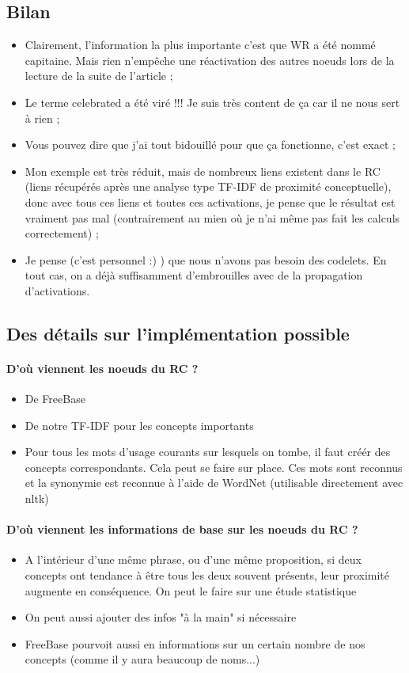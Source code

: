 \documentclass{article}           %
\begin{document}
\subsection{Bilan}
\begin{itemize}
 \item Clairement, l'information la plus importante c'est que WR a été nommé capitaine. Mais rien n'empêche une réactivation des autres noeuds lors de la lecture de la suite de l'article ;
 \item Le terme celebrated a été viré !!! Je suis très content de ça car il ne nous sert à rien ;
 \item Vous pouvez dire que j'ai tout bidouillé pour que ça fonctionne, c'est exact ;
 \item Mon exemple est très réduit, mais de nombreux liens existent dans le RC (liens récupérés après une analyse type TF-IDF de proximité conceptuelle), donc avec tous ces liens et toutes ces activations, je pense que le résultat est vraiment pas mal (contrairement au mien où je n'ai même pas fait les calculs correctement) ;
 \item Je pense (c'est personnel :) ) que nous n'avons pas besoin des codelets. En tout cas, on a déjà suffisamment d'embrouilles avec de la propagation d'activations.
\end{itemize}

\subsection{Des détails sur l'implémentation possible}

\paragraph{D'où viennent les noeuds du RC ?}
\begin{itemize}
 \item De FreeBase
 \item De notre TF-IDF pour les concepts importants
 \item Pour tous les mots d'usage courants sur lesquels on tombe, il faut créér des concepts correspondants. Cela peut se faire sur place. Ces mots sont reconnus et la synonymie est reconnue à l'aide de WordNet (utilisable directement avec nltk)
\end{itemize}

\paragraph{D'où viennent les informations de base sur les noeuds du RC ?}
\begin{itemize}
 \item A l'intérieur d'une même phrase, ou d'une même proposition, si deux concepts ont tendance à être tous les deux souvent présents, leur proximité augmente en conséquence. On peut le faire sur une étude statistique
 \item On peut aussi ajouter des infos "à la main" si nécessaire
 \item FreeBase pourvoit aussi en informations sur un certain nombre de nos concepts (comme il y aura beaucoup de noms...)
\end{itemize}

 
\end{document}
